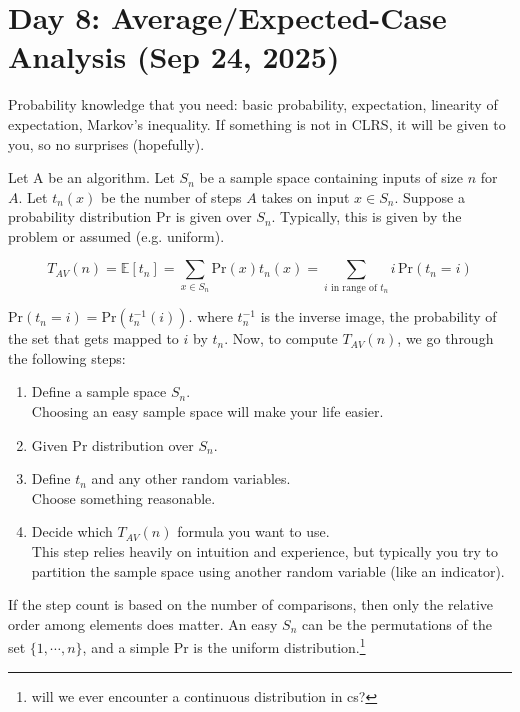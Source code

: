 \section{Day 8: Average/Expected-Case Analysis (Sep 24, 2025)}

Probability knowledge that you need: basic probability, expectation, linearity of expectation, Markov's inequality. If something is not in CLRS, it will be given to you, so no surprises (hopefully).

Let \textsc{A} be an algorithm. Let $S_n$ be a sample space containing inputs of size $n$ for $A$. Let $t_n(x)$ be the number of steps $A$ takes on input $x \in S_n$. Suppose a probability distribution $\text{Pr}$ is given over $S_n$. Typically, this is given by the problem or assumed (e.g. uniform).

\begin{definition}
\[
    T_{AV}(n) = \mathbb{E}[t_n] = \sum_{x \in S_n} \text{Pr}(x) t_n(x) = \sum_{\text{$i$ in range of $t_n$}} i \, \text{Pr}(t_n = i)
\]
\end{definition}

$\text{Pr}(t_n = i) = \text{Pr}(t_n^{-1}(i))$. where $t_n^{-1}$ is the inverse image, the probability of the set that gets mapped to $i$ by $t_n$. Now, to compute $T_{AV}(n)$, we go through the following steps:
\begin{enumerate}
\item Define a sample space $S_n$.\\
    Choosing an easy sample space will make your life easier.
\item Given $\text{Pr}$ distribution over $S_n$.
\item Define $t_n$ and any other random variables.\\
Choose something reasonable.
    \item Decide which $T_{AV}(n)$ formula you want to use. \\
    This step relies heavily on intuition and experience, but typically you try to partition the sample space using another random variable (like an indicator).
\end{enumerate}

If the step count is based on the number of comparisons, then only the relative order among elements does matter. An easy $S_n$ can be the permutations of the set $\{ 1, \cdots, n \}$, and a simple $\text{Pr}$ is the uniform distribution.\footnote{will we ever encounter a continuous distribution in cs?} 

